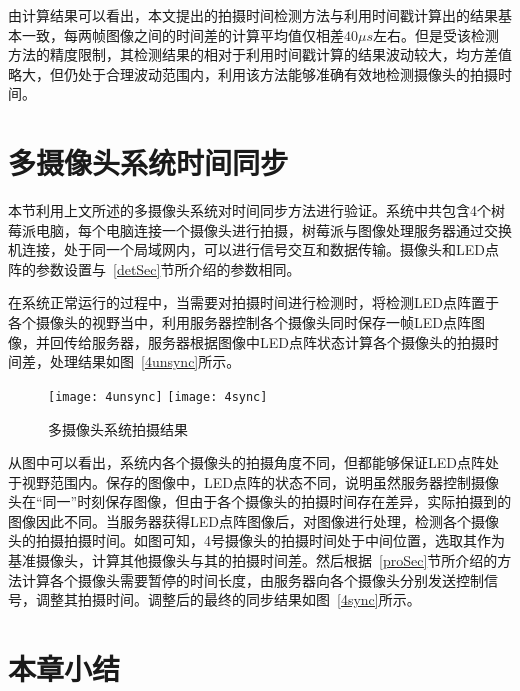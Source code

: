 由计算结果可以看出，本文提出的拍摄时间检测方法与利用时间戳计算出的结果基本一致，每两帧图像之间的时间差的计算平均值仅相差$40\mu s$左右。但是受该检测方法的精度限制，其检测结果的相对于利用时间戳计算的结果波动较大，均方差值略大，但仍处于合理波动范围内，利用该方法能够准确有效地检测摄像头的拍摄时间。

\section{多摄像头系统时间同步}

本节利用上文所述的多摄像头系统对时间同步方法进行验证。系统中共包含4个树莓派电脑，每个电脑连接一个摄像头进行拍摄，树莓派与图像处理服务器通过交换机连接，处于同一个局域网内，可以进行信号交互和数据传输。摄像头和LED点阵的参数设置与~\ref{detSec}节所介绍的参数相同。

在系统正常运行的过程中，当需要对拍摄时间进行检测时，将检测LED点阵置于各个摄像头的视野当中，利用服务器控制各个摄像头同时保存一帧LED点阵图像，并回传给服务器，服务器根据图像中LED点阵状态计算各个摄像头的拍摄时间差，处理结果如图~\ref{4unsync}所示。

\begin{figure}[h] 
  \centering%
    {\texttt{[image: 4unsync]}}
    {\texttt{[image: 4sync]}}
  \caption{多摄像头系统拍摄结果}
\end{figure}

从图中可以看出，系统内各个摄像头的拍摄角度不同，但都能够保证LED点阵处于视野范围内。保存的图像中，LED点阵的状态不同，说明虽然服务器控制摄像头在“同一”时刻保存图像，但由于各个摄像头的拍摄时间存在差异，实际拍摄到的图像因此不同。当服务器获得LED点阵图像后，对图像进行处理，检测各个摄像头的拍摄拍摄时间。如图可知，4号摄像头的拍摄时间处于中间位置，选取其作为基准摄像头，计算其他摄像头与其的拍摄时间差。然后根据~\ref{proSec}节所介绍的方法计算各个摄像头需要暂停的时间长度，由服务器向各个摄像头分别发送控制信号，调整其拍摄时间。调整后的最终的同步结果如图~\ref{4sync}所示。

\section{本章小结}

